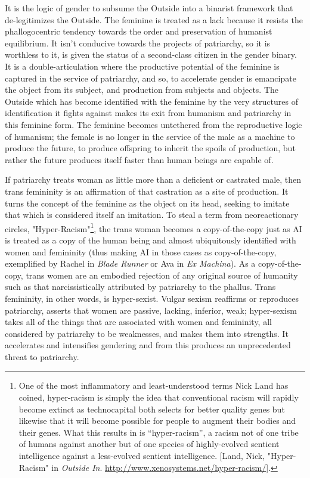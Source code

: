 \documentclass[10pt, statementpaper, twoside, openright]{memoir}
\begin{document}
It is the logic of gender to subsume the Outside into a binarist framework that de-legitimizes the Outside. The feminine is treated as a lack because it resists the phallogocentric tendency towards the order and preservation of humanist equilibrium. It isn't conducive towards the projects of patriarchy, so it is worthless to it, is given the status of a second-class citizen in the gender binary. It is a double-articulation where the productive potential of the feminine is captured in the service of patriarchy, and so, to accelerate gender is emancipate the object from its subject, and production from subjects and objects. The Outside which has become identified with the feminine by the very structures of identification it fights against makes its exit from humanism and patriarchy in this feminine form. The feminine becomes untethered from the reproductive logic of humanism; the female is no longer in the service of the male as a machine to produce the future, to produce offspring to inherit the spoils of production, but rather the future produces itself faster than human beings are capable of.

If patriarchy treats woman as little more than a deficient or castrated male, then trans femininity is an affirmation of that castration as a site of production. It turns the concept of the feminine as the object on its head, seeking to imitate that which is considered itself an imitation. To steal a term from neoreactionary circles, "Hyper-Racism"\footnote{One of the most inflammatory and least-understood terms Nick Land has coined, hyper-racism is simply the idea that conventional racism will rapidly become extinct as technocapital both selects for better quality genes but likewise that it will become possible for people to augment their bodies and their genes. What this results in is “hyper-racism”, a racism not of one tribe of humans against another but of one species of highly-evolved sentient intelligence against a less-evolved sentient intelligence. [Land, Nick, "Hyper-Racism" in \textit{Outside In}. \href{http://www.xenosystems.net/hyper-racism/}{http://www.xenosystems.net/hyper-racism/}].}, the trans woman becomes a copy-of-the-copy just as AI is treated as a copy of the human being and almost ubiquitously identified with women and femininity (thus making AI in those cases as copy-of-the-copy, exemplified by Rachel in \textit{Blade Runner} or Ava in \textit{Ex Machina}). As a copy-of-the-copy, trans women are an embodied rejection of any original source of humanity such as that narcissistically attributed by patriarchy to the phallus. Trans femininity, in other words, is hyper-sexist. Vulgar sexism reaffirms or reproduces patriarchy, asserts that women are passive, lacking, inferior, weak; hyper-sexism takes all of the things that are associated with women and femininity, all considered by patriarchy to be weaknesses, and makes them into strengths. It accelerates and intensifies gendering and from this produces an unprecedented threat to patriarchy.
\end{document}
